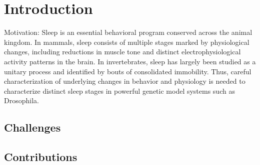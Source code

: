 \chapter{Introduction}

Motivation: Sleep is an essential behavioral program conserved across the animal kingdom.
In mammals, sleep consists of multiple stages marked by physiological changes, including reductions in muscle tone and distinct electrophysiological activity patterns in the brain.
In invertebrates, sleep has largely been studied as a unitary process and identified by bouts of consolidated immobility.
Thus, careful characterization of underlying changes in behavior and physiology is needed to characterize distinct sleep stages in powerful genetic model systems such as Drosophila.

\section{Challenges}\label{section:challanges}

\section{Contributions}
